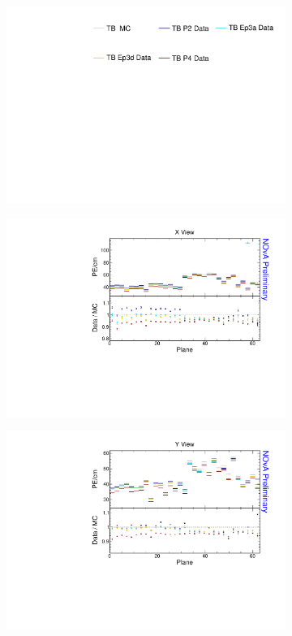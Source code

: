 \begin{figure}[!ht]
  \begin{subfigure}{\textwidth}
  \centering
    \includegraphics[height=0.2\linewidth]{essentialsec_tb/legend.pdf}
  \end{subfigure}
  \vspace*{2mm}

  \begin{subfigure}{0.495\textwidth}
    \includegraphics[width=\linewidth]{essentialsec_tb/pecm_plane_x.pdf}
  \end{subfigure}
  \begin{subfigure}{0.495\textwidth}
    \includegraphics[width=\linewidth]{essentialsec_tb/pecm_plane_y.pdf}

\end{subfigure}
\end{figure}
